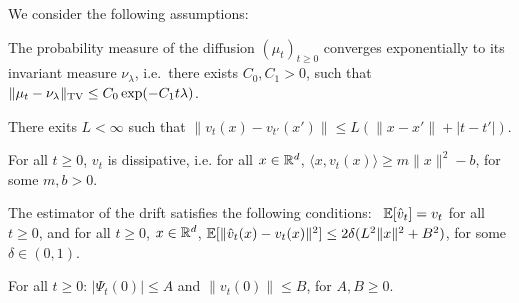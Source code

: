 We consider the following assumptions: \vspace{\minvsp pt}
\begin{assumption}
\label{asmp:sde_expconv}
The probability measure of the diffusion $(\mu_t)_{t\geq 0}$ converges exponentially to its invariant measure $\nu_\lambda$, i.e.\ there exists $C_0, C_1 >0$, such that
$\|\mu_t - \nu_\lambda \|_{\textnormal{TV}} \leq C_0 \exp(-C_1 t \lambda)$.
\vspace{\minvsp pt}
\end{assumption}
%
\begin{assumption}
\label{asmp:lipschitz}
There exits $L < \infty$ such that
$\| v_t(x) - v_{t'}(x') \| \leq L ( \|x-x' \| + |t-t'|)$.
\vspace{\minvsp pt}
\end{assumption}
%
\begin{assumption}
\label{asmp:dissip}
For all $t \geq 0$, $v_t$ is dissipative, i.e. for all $x \in \mathbb{R}^d$,
$\langle x, v_t(x) \rangle \geq m \|x\|^2 -b$,
for some $m,b >0$.
\vspace{\minvsp pt}
\end{assumption}
%
\begin{assumption}
\label{asmp:stochgrad}
The estimator of the drift satisfies the following conditions: \ $\mathbb{E}[\hat{v}_t] = v_t$ for all $t \geq 0$, and for all $t\geq 0$, $x \in \mathbb{R}^d$,
$\mathbb{E}[ \|\hat{v}_t(x) - v_t(x) \|^2] \leq 2 \delta(L^2 \|x\|^2 + B^2)$,
for some $\delta \in (0,1)$.
\vspace{\minvsp pt}
\end{assumption}
%
\begin{assumption}
\label{asmp:init_fun}
For all $t \geq 0$: $|\Psi_t(0)| \leq A$ and $\|v_t(0)\| \leq B$,
for $A,B \geq 0$.
\end{assumption}



